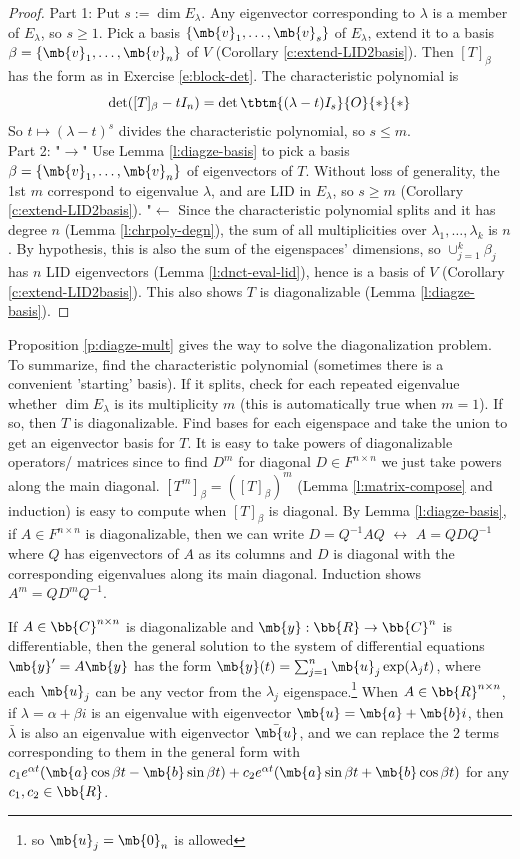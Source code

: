 \begin{proof}%
Part 1: Put $s:= \dim E_\lambda$. Any eigenvector corresponding to $\lambda$ is a member of $E_\lambda$, so $s \geq 1$. Pick a basis $\{ \mb{v}_1, \ldots, \mb{v}_s \}$ of $E_\lambda$, extend it to a basis $\beta = \{ \mb{v}_1, \ldots, \mb{v}_n \}$ of $V$ (Corollary \ref{c:extend-LID2basis}).
Then $[T]_\beta$ has the form as in Exercise \ref{e:block-det}. The characteristic polynomial is
\[ \det ([T]_\beta -tI_n)= \det \tbtm{( \lambda -t)I_s}{O}{*}{*}\]
So $t \mapsto (\lambda -t)^s$ divides the characteristic polynomial, so $s \leq m$.\\
Part 2: "$\to$" Use Lemma \ref{l:diagze-basis} to pick a basis $\beta = \{ \mb{v}_1, \ldots, \mb{v}_n \}$ of eigenvectors of $T$.
Without loss of generality, the 1st $m$ correspond to eigenvalue $\lambda$, and are LID in $E_\lambda$, so $s \geq m$ (Corollary \ref{c:extend-LID2basis}).
"$\leftarrow$ Since the characteristic polynomial splits and it has degree $n$ (Lemma \ref{l:chrpoly-degn}), the sum of all multiplicities over $\lambda_1, \ldots, \lambda_k$ is $n$.
By hypothesis, this is also the sum of the eigenspaces' dimensions, so $\cup_{j=1}^k \beta_j$ has $n$ LID eigenvectors (Lemma \ref{l:dnct-eval-lid}), hence is a basis of $V$ (Corollary \ref{c:extend-LID2basis}). This also shows $T$ is diagonalizable (Lemma \ref{l:diagze-basis}).
\end{proof}
Proposition \ref{p:diagze-mult} gives the way to solve the diagonalization problem. To summarize, find the characteristic polynomial (sometimes there is a convenient 'starting' basis). If it splits, check for each repeated eigenvalue whether $\dim E_\lambda$ is its multiplicity $m$ (this is automatically true when $m=1$).
If so, then $T$ is diagonalizable. Find bases for each eigenspace and take the union to get an eigenvector basis for $T$.
It is easy to take powers of diagonalizable operators/ matrices since to find $D^m$ for diagonal $D \in F^{n \times n}$ we just take powers along the main diagonal. $[T^m]_\beta=([T]_\beta)^m$ (Lemma \ref{l:matrix-compose} and induction) is easy to compute when $[T]_\beta$ is diagonal.
By Lemma \ref{l:diagze-basis}, if $A \in F^{n \times n}$ is diagonalizable, then we can write $D=Q^{-1}AQ$ $\leftrightarrow$ $A=QDQ^{-1}$ where $Q$ has eigenvectors of $A$ as its columns and $D$ is diagonal with the corresponding eigenvalues along its main diagonal. Induction shows $A^m=QD^mQ^{-1}$.
\begin{prop}
If $A \in \bb{C}^{n \times n}$ is diagonalizable and $\mb{y}: \bb{R}\to \bb{C}^n$ is differentiable, then the general solution to the system of differential equations $\mb{y}'=A \mb{y}$ has the form $\mb{y}(t)= \sum_{j=1}^n \mb{u}_j \exp( \lambda_jt)$, where each $\mb{u}_j$ can be any vector from the $\lambda_j$ eigenspace.\footnote{so $\mb{u}_j= \mb{0}_n$ is allowed}
When $A \in \bb{R}^{n \times n}$, if $\lambda = \alpha + \beta i$ is an eigenvalue with eigenvector $\mb{u}= \mb{a}+ \mb{b}i$, then $\bar{\lambda}$ is also an eigenvalue with eigenvector $\bar{\mb{u}}$, and we can replace the 2 terms corresponding to them in the general form with $c_1e^{\alpha t}( \mb{a}\cos \beta t- \mb{b}\sin \beta t)+c_2e^{\alpha t}( \mb{a}\sin \beta t+ \mb{b}\cos \beta t)$ for any $c_1, c_2 \in \bb{R}$.
\end{prop}
